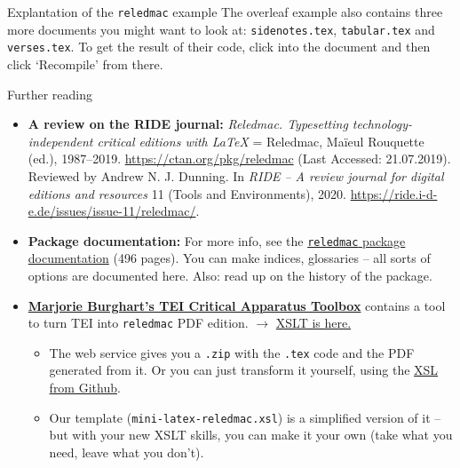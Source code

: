 \begin{frame}{Explantation of the \texttt{reledmac} example}
    The overleaf example also contains three more documents you might want to look at: \texttt{sidenotes.tex}, \texttt{tabular.tex} and \texttt{verses.tex}. 
    To get the result of their code, click into the document and then click `Recompile' from there. 
    
    \framebreak
    
    \begin{block}{Further reading}
    \begin{itemize}\footnotesize
        \item \textbf{A review on the RIDE journal:} {\scriptsize \emph{Reledmac. Typesetting technology-independent critical editions with LaTeX} = Reledmac, Maïeul Rouquette (ed.), 1987--2019. \protect\url{https://ctan.org/pkg/reledmac} (Last Accessed: 21.07.2019). Reviewed by Andrew N. J. Dunning. In \emph{RIDE – A review journal for digital editions and resources} 11 (Tools and Environments), 2020. \protect\url{https://ride.i-d-e.de/issues/issue-11/reledmac/}. }
        \item \textbf{Package documentation:} For more info, see the \href{https://ctan.org/pkg/reledmac}{\texttt{reledmac} package documentation} (496 pages). {\scriptsize You can make indices, glossaries -- all sorts of options are documented here. Also: read up on the history of the package. }
        \item \textbf{\href{https://web.archive.org/web/20191211173459/http://teicat.huma-num.fr/}{Marjorie Burghart’s TEI Critical Apparatus Toolbox}} contains a tool to turn TEI into \texttt{reledmac} PDF edition. $\to$ \href{https://github.com/MarjorieBurghart/TEI-CAT/blob/master/tei2latex_final.xslt}{XSLT is here.}
        \begin{itemize}\scriptsize
            \item The web service gives you a \texttt{.zip} with the \texttt{.tex} code and the PDF generated from it. Or you can just transform it yourself, using the \href{https://github.com/MarjorieBurghart/TEI-CAT/blob/master/tei2latex_final.xslt}{XSL from Github}.
            \item Our template (\texttt{mini-latex-reledmac.xsl}) is a simplified version of it -- but with your new XSLT skills, you can make it your own (take what you need, leave what you don't).
        \end{itemize}
    \end{itemize}
    \end{block}
    
    
\end{frame}



